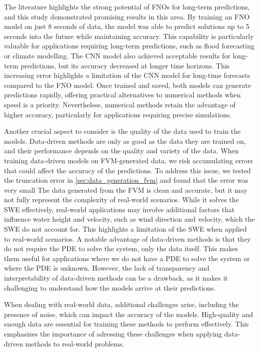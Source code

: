 The literature highlights the strong potential of FNOs for long-term predictions, and this study demonstrated promising results in this area.
By training an FNO model on just 8 seconds of data, the model was able to predict solutions up to 5 seconds into the future while maintaining accuracy.
This capability is particularly valuable for applications requiring long-term predictions, such as flood forecasting or climate modelling.
The CNN model also achieved acceptable results for long-term predictions, but its accuracy decreased at longer time horizons.
This increasing error highlights a limitation of the CNN model for long-time forecasts compared to the FNO model.
Once trained and saved, both models can generate predictions rapidly, offering practical alternatives to numerical methods when speed is a priority.
Nevertheless, numerical methods retain the advantage of higher accuracy, particularly for applications requiring precise simulations.

Another crucial aspect to consider is the quality of the data used to train the models.
Data-driven methods are only as good as the data they are trained on, and their performance depends on the quality and variety of the data.
When training data-driven models on FVM-generated data, we risk accumulating errors that could affect the accuracy of the predictions.
To address this issue, we tested the truncation error in \autoref{sec:data_generation_fvm} and found that the error was very small
The data generated from the FVM is clean and accurate, but it may not fully represent the complexity of real-world scenarios.
While it solves the SWE effectively, real-world applications may involve additional factors that influence water height and velocity, such as wind direction and velocity, which the SWE do not account for.
This highlights a limitation of the SWE when applied to real-world scenarios.
A notable advantage of data-driven methods is that they do not require the PDE to solve the system, only the data itself.
This makes them useful for applications where we do not have a PDE to solve the system or where the PDE is unknown.
However, the lack of transparency and interpretability of data-driven methods can be a drawback, as it makes it challenging to understand how the models arrive at their predictions.

When dealing with real-world data, additional challenges arise, including the presence of noise, which can impact the accuracy of the models.
High-quality and enough data are essential for training these methods to perform effectively.
This emphasizes the importance of adressing these challenges when applying data-driven methods to real-world problems.



